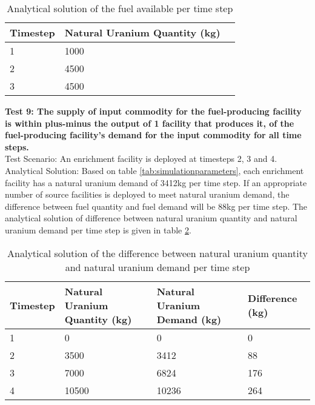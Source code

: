 \documentclass[11pt,letterpaper]{article}
\begin{document}
\begin{table}[H]
     \centering
    \begin{tabularx}{\textwidth}{bbb}
       \hline
       Timestep & Natural Uranium Quantity (kg)  \\
       \hline
       1 & 1000 \\
       2 & 4500 \\
       3 & 4500\\
       \hline
    \end{tabularx}
    \caption {Analytical solution of the fuel available per time step}
    \label{tab:test-NUdemand2}
\end{table}

\noindent
\textbf{Test 9: The supply of input commodity for the fuel-producing facility is within plus-minus the output of 1 facility that produces it, of the fuel-producing facility's demand for the input commodity for all time steps.} \\
Test Scenario: An enrichment facility is deployed at timesteps 2, 3 and 4.\\
Analytical Solution: Based on table \ref{tab:simulationparameters}, each enrichment facility has a natural uranium demand of 3412kg per time step. If an appropriate number of source facilities is deployed to meet natural uranium demand, the difference between fuel quantity and fuel demand will be 88kg per time step. The analytical solution of difference between natural uranium quantity and natural uranium demand per time step is given in table \ref{tab:test-NUdiff}.  

\begin{table}[H]
     \centering
    \begin{tabularx}{\textwidth}{bbbb}
       \hline
       Timestep & Natural Uranium Quantity (kg) & Natural Uranium Demand (kg) & Difference (kg)\\
       \hline
       1 & 0 & 0 & 0\\
       2 & 3500 & 3412 & 88\\
       3 &  7000 & 6824 & 176\\
       4 & 10500 & 10236 & 264\\
       \hline
    \end{tabularx}
    \caption {Analytical solution of the difference between natural uranium  quantity and natural uranium demand per time step}
    \label{tab:test-NUdiff}
\end{table}
\end{document}
